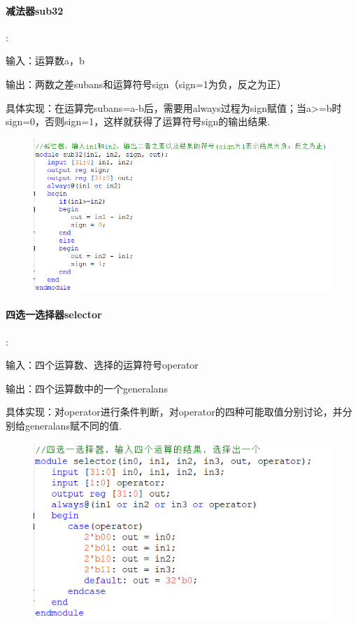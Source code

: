 \documentclass[UTF8]{ctexart}
\begin{document}
\paragraph{减法器sub32}:\par
输入：运算数a，b\par
输出：两数之差subans和运算符号sign（sign=1为负，反之为正）\par
具体实现：在运算完subans=a-b后，需要用always过程为sign赋值；当a>=b时sign=0，否则sign=1，这样就获得了运算符号sign的输出结果.
\begin{figure}[H]\begin{center}
    \includegraphics[scale=1]{sub32.PNG}
\end{center}\end{figure}
\paragraph{四选一选择器selector}:\par
输入：四个运算数、选择的运算符号operator\par
输出：四个运算数中的一个generalans\par
具体实现：对operator进行条件判断，对operator的四种可能取值分别讨论，并分别给generalans赋不同的值.
\begin{figure}[H]\begin{center}
    \includegraphics[scale=1]{selector.PNG}
\end{center}\end{figure}
\end{document}
